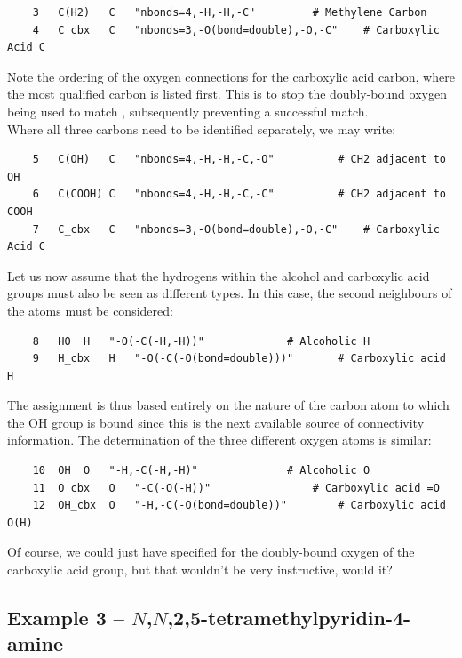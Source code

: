 \begin{verbatim}
    3	C(H2)	C	"nbonds=4,-H,-H,-C"			# Methylene Carbon
    4	C_cbx	C	"nbonds=3,-O(bond=double),-O,-C"	# Carboxylic Acid C
\end{verbatim}

Note the ordering of the oxygen connections for the carboxylic acid carbon, where the most qualified carbon is listed first. This is to stop the doubly-bound oxygen being used to match , subsequently preventing a successful match. \\

Where all three carbons need to be identified separately, we may write:

\begin{verbatim}
    5	C(OH)	C	"nbonds=4,-H,-H,-C,-O"			# CH2 adjacent to OH
    6	C(COOH)	C	"nbonds=4,-H,-H,-C,-C"			# CH2 adjacent to COOH
    7	C_cbx	C	"nbonds=3,-O(bond=double),-O,-C"	# Carboxylic Acid C
\end{verbatim}

Let us now assume that the hydrogens within the alcohol and carboxylic acid groups must also be seen as different types. In this case, the second neighbours of the atoms must be considered:

\begin{verbatim}
    8	HO	H	"-O(-C(-H,-H))"				# Alcoholic H
    9	H_cbx	H	"-O(-C(-O(bond=double)))"		# Carboxylic acid H
\end{verbatim}

The assignment is thus based entirely on the nature of the carbon atom to which the OH group is bound since this is the next available source of connectivity information. The determination of the three different oxygen atoms is similar:

\begin{verbatim}
    10	OH	O	"-H,-C(-H,-H)"				# Alcoholic O
    11	O_cbx	O	"-C(-O(-H))"				# Carboxylic acid =O
    12	OH_cbx	O	"-H,-C(-O(bond=double))"		# Carboxylic acid O(H)
\end{verbatim}

Of course, we could just have specified  for the doubly-bound oxygen of the carboxylic acid group, but that wouldn't be very instructive, would it? 


\subsection{Example 3 -- $N$,$N$,2,5-tetramethylpyridin-4-amine}

